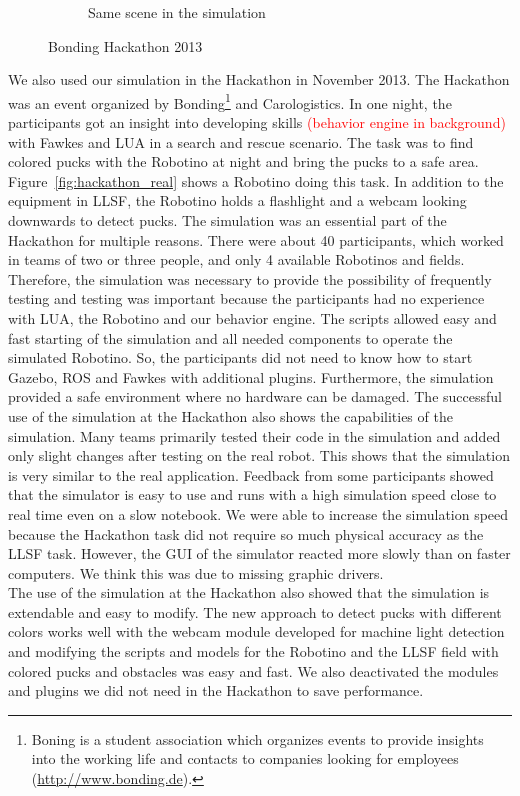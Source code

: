\begin{figure}
\begin{subfigure}[b]{0.48\textwidth}
    \caption{Same scene in the simulation\\}
    \label{fig:hackathon_sim}
  \end{subfigure}
  \caption{Bonding Hackathon 2013}
  \label{fig:hackathon}
\end{figure}
We also used our simulation in the Hackathon in November 2013. The Hackathon was an event organized by Bonding\footnote{Boning is a student association which organizes events to provide insights into the working life and contacts to companies looking for employees (\url{http://www.bonding.de}).} and Carologistics. In one night, the participants got an insight into developing skills \textcolor{red}{(behavior engine in background)} with Fawkes and LUA in a search and rescue scenario. The task was to find colored pucks with the Robotino at night and bring the pucks to a safe area. Figure~\ref{fig:hackathon_real} shows a Robotino doing this task. In addition to the equipment in LLSF, the Robotino holds a flashlight and a webcam looking downwards to detect pucks. The simulation was an essential part of the Hackathon for multiple reasons. There were about 40 participants, which worked in teams of two or three people, and only 4 available Robotinos and fields. Therefore, the simulation was necessary to provide the possibility of frequently testing and testing was important because the participants had no experience with LUA, the Robotino and our behavior engine. The scripts allowed easy and fast starting of the simulation and all needed components to operate the simulated Robotino. So, the participants did not need to know how to start Gazebo, ROS and Fawkes with additional plugins. Furthermore, the simulation provided a safe environment where no hardware can be damaged. The successful use of the simulation at the Hackathon also shows the capabilities of the simulation. Many teams primarily tested their code in the simulation and added only slight changes after testing on the real robot. This shows that the simulation is very similar to the real application. Feedback from some participants showed that the simulator is easy to use and runs with a high simulation speed close to real time even on a slow notebook. We were able to increase the simulation speed because the Hackathon task did not require so much physical accuracy as the LLSF task. However, the GUI of the simulator reacted more slowly than on faster computers. We think this was due to missing graphic drivers.\\
The use of the simulation at the Hackathon also showed that the simulation is extendable and easy to modify. The new approach to detect pucks with different colors works well with the webcam module developed for machine light detection and modifying the scripts and  models for the Robotino and the LLSF field with colored pucks and obstacles was easy and fast. We also deactivated the modules and plugins we did not need in the Hackathon to save performance.\\
